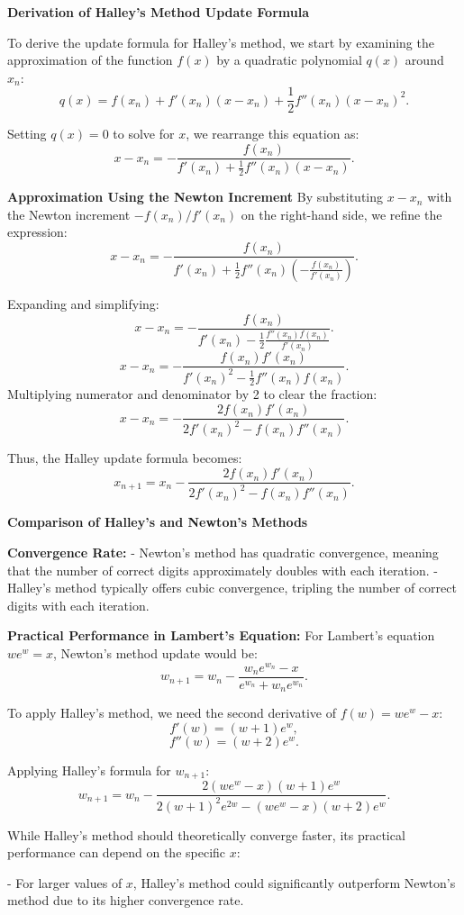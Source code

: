 \documentclass[8pt]{article}
\begin{document}
\textbf{Derivation of Halley's Method Update Formula}

To derive the update formula for Halley's method, we start by examining the approximation of the function \(f(x)\) by a quadratic polynomial \(q(x)\) around \(x_n\):
\[ q(x) = f(x_n) + f'(x_n)(x - x_n) + \frac{1}{2} f''(x_n)(x - x_n)^2. \]

Setting \(q(x) = 0\) to solve for \(x\), we rearrange this equation as:
\[ x - x_n = -\frac{f(x_n)}{f'(x_n) + \frac{1}{2} f''(x_n)(x - x_n)}. \]

\textbf{Approximation Using the Newton Increment}
By substituting \(x - x_n\) with the Newton increment \(-f(x_n)/f'(x_n)\) on the right-hand side, we refine the expression:
\[ x - x_n = -\frac{f(x_n)}{f'(x_n) + \frac{1}{2} f''(x_n)\left(-\frac{f(x_n)}{f'(x_n)}\right)}. \]

Expanding and simplifying:
\[ x - x_n = -\frac{f(x_n)}{f'(x_n) - \frac{1}{2} \frac{f''(x_n)f(x_n)}{f'(x_n)}}. \]
\[ x - x_n = -\frac{f(x_n)f'(x_n)}{f'(x_n)^2 - \frac{1}{2} f''(x_n)f(x_n)}. \]
Multiplying numerator and denominator by 2 to clear the fraction:
\[ x - x_n = -\frac{2f(x_n)f'(x_n)}{2f'(x_n)^2 - f(x_n)f''(x_n)}. \]

Thus, the Halley update formula becomes:
\[ x_{n+1} = x_n - \frac{2f(x_n)f'(x_n)}{2f'(x_n)^2 - f(x_n)f''(x_n)}. \]

\textbf{Comparison of Halley's and Newton's Methods}

\textbf{Convergence Rate:}
- Newton's method has quadratic convergence, meaning that the number of correct digits approximately doubles with each iteration.
- Halley's method typically offers cubic convergence, tripling the number of correct digits with each iteration.

\textbf{Practical Performance in Lambert's Equation:}
For Lambert's equation \(we^w = x\), Newton's method update would be:
\[ w_{n+1} = w_n - \frac{w_n e^{w_n} - x}{e^{w_n} + w_n e^{w_n}}. \]

To apply Halley's method, we need the second derivative of \(f(w) = we^w - x\):
\[ f'(w) = (w + 1)e^w, \]
\[ f''(w) = (w + 2)e^w. \]

Applying Halley’s formula for \(w_{n+1}\):
\[ w_{n+1} = w_n - \frac{2(we^w - x)(w+1)e^w}{2(w+1)^2 e^{2w} - (we^w - x)(w+2)e^w}. \]

While Halley's method should theoretically converge faster, its practical performance can depend on the specific \(x\):

- For larger values of \(x\), Halley's method could significantly outperform Newton's method due to its higher convergence rate.
\end{document}
